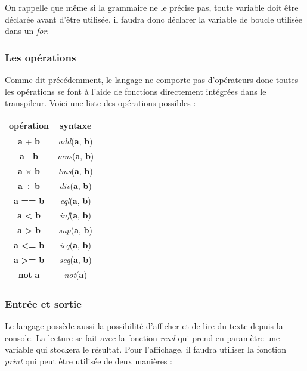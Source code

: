 \documentclass[a4paper]{article}%
\begin{document}
On rappelle que même si la grammaire ne le précise pas, toute variable doit être
déclarée avant d'être utilisée, il faudra donc déclarer la variable de boucle
utilisée dans un \textit{for}.

\subsubsection*{Les opérations}
\label{sec:operator}

Comme dit précédemment, le langage ne comporte pas d'opérateurs donc toutes
les opérations se font à l'aide de fonctions directement intégrées dans le
transpileur. Voici une liste des opérations possibles :

\begin{center}
\begin{tabular}{ | c | c | }
    \hline
    opération & syntaxe\\
    \hline
    \textbf{a} + \textbf{b} & \textit{add}(\textbf{a}, \textbf{b})\\
    \hline
    \textbf{a} - \textbf{b} & \textit{mns}(\textbf{a}, \textbf{b})\\
    \hline
    \textbf{a} $\times$ \textbf{b} & \textit{tms}(\textbf{a}, \textbf{b})\\
    \hline
    \textbf{a} $\div$ \textbf{b} & \textit{div}(\textbf{a}, \textbf{b})\\
    \hline
    \textbf{a} \textbf{==} \textbf{b} & \textit{eql}(\textbf{a}, \textbf{b})\\
    \hline
    \textbf{a} \textbf{<} \textbf{b} & \textit{inf}(\textbf{a}, \textbf{b})\\
    \hline
    \textbf{a} \textbf{>} \textbf{b} & \textit{sup}(\textbf{a}, \textbf{b})\\
    \hline
    \textbf{a} \textbf{<=} \textbf{b} & \textit{ieq}(\textbf{a}, \textbf{b})\\
    \hline
    \textbf{a} \textbf{>=} \textbf{b} & \textit{seq}(\textbf{a}, \textbf{b})\\
    \hline
    \textbf{not} \textbf{a} & \textit{not}(\textbf{a})\\
    \hline
\end{tabular}
\end{center}

\subsubsection*{Entrée et sortie}

Le langage possède aussi la possibilité d'afficher et de lire du texte depuis la
console. La lecture se fait avec la fonction \textit{read} qui prend en
paramètre une variable qui stockera le résultat. Pour l'affichage, il faudra
utiliser la fonction \textit{print} qui peut être utilisée de deux manières :
\end{document}

